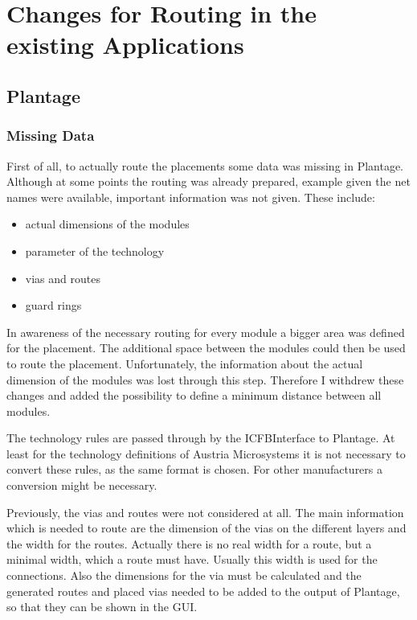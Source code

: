 \section{Changes for Routing in the existing Applications}

\subsection{Plantage}

\subsubsection{Missing Data}
First of all, to actually route the placements some data was missing in Plantage. Although at some points the routing was already prepared, example given the net names were available, important information was not given. These include:
\begin{itemize}
\item actual dimensions of the modules
\item parameter of the technology
\item vias and routes
\item guard rings
\end{itemize}

In awareness of the necessary routing for every module a bigger area was defined for the placement. The additional space between the modules could then be used to route the placement. Unfortunately, the information about the actual dimension of the modules was lost through this step. Therefore I withdrew these changes and added the possibility to define a minimum distance between all modules.

The technology rules are passed through by the ICFBInterface to Plantage. At least for the technology definitions of Austria Microsystems it is not necessary to convert these rules, as the same format is chosen. For other manufacturers a conversion might be necessary.

Previously, the vias and routes were not considered at all. The main information which is needed to route are the dimension of the vias on the different layers and the width for the routes. Actually there is no real width for a route, but a minimal width, which a route must have. Usually this width is used for the connections. Also the dimensions for the via must be calculated  and the generated routes and placed vias needed to be added to the output of Plantage, so that they can be shown in the GUI.

